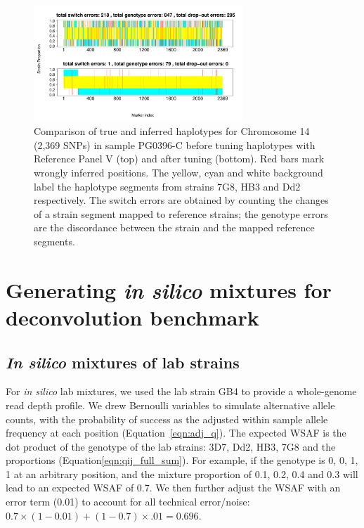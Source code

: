 \documentclass[9pt]{article}
\begin{document}
\begin{figure}[htp]
  \centering
    \includegraphics[width=0.7\textwidth]{DEploid_IBD_haps_compare.pdf}
  \caption{Comparison of true and inferred haplotypes for Chromosome 14 (2,369 SNPs) in sample PG0396-C before tuning haplotypes with Reference Panel V (top) and after tuning (bottom). Red bars mark wrongly inferred positions. The yellow, cyan and white background label the haplotype segments from strains 7G8, HB3 and Dd2 respectively. The switch errors are obtained by counting the changes of a strain segment mapped to reference strains; the genotype errors are the discordance between the strain and the mapped reference segments.
  }
  \label{fig:error}
\end{figure}




\newpage

\section{Generating {\it in silico} mixtures for deconvolution benchmark}
\subsection{{\it In silico} mixtures of lab strains}
For {\it in silico} lab mixtures, we used the lab strain GB4 to provide a whole-genome read depth profile. We drew Bernoulli variables to simulate alternative allele counts, with the probability of success as the adjusted within sample allele frequency at each position (Equation~\eqref{eqn:adj_q}). The expected WSAF is the dot product of the genotype of the lab strains: 3D7, Dd2, HB3, 7G8 and the proportions (Equation\eqref{eqn:qij_full_sum}). For example, if the genotype is 0, 0, 1, 1 at an arbitrary position, and the mixture proportion of 0.1, 0.2, 0.4 and 0.3 will lead to an expected WSAF of 0.7. We then further adjust the WSAF with an error term (0.01) to account for all technical error/noise: $0.7 \times(1-0.01) + (1-0.7) \times.01 = 0.696$.
\end{document}
